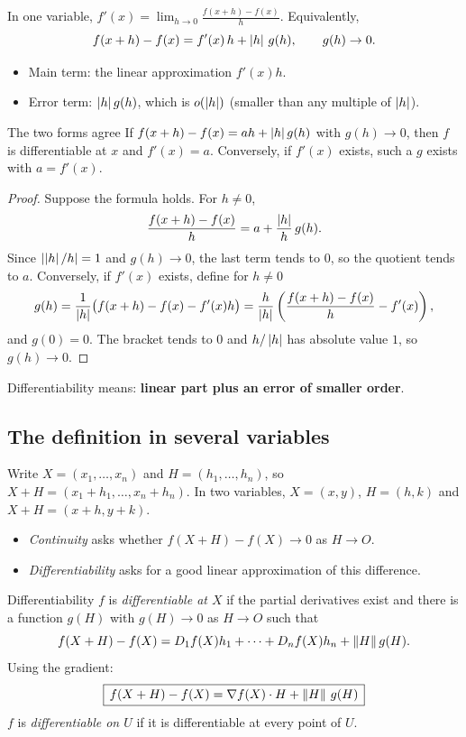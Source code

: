 In one variable, $f'(x)=\lim_{h\to0}\frac{f(x+h)-f(x)}{h}$. Equivalently,
\[
 f(x+h)-f(x)=f'(x)\,h+\left\lvert h\right\rvert\,g(h),\qquad g(h)\to0 .
\]
\begin{itemize}
  \item Main term: the linear approximation $f'(x)h$.
  \item Error term: $\left\lvert h\right\rvert g(h)$, which is $o(\left\lvert h\right\rvert)$ (smaller than any multiple of $\left\lvert h\right\rvert$).
\end{itemize}

\begin{proposition}{The two forms agree}
If $f(x+h)-f(x)=ah+\left\lvert h\right\rvert g(h)$ with $g(h)\to0$, then $f$ is differentiable at $x$ and
$f'(x)=a$. Conversely, if $f'(x)$ exists, such a $g$ exists with $a=f'(x)$.
\end{proposition}

\begin{proof}
Suppose the formula holds. For $h\neq0$,
\[
\frac{f(x+h)-f(x)}{h}=a+\frac{\left\lvert h\right\rvert}{h}\,g(h).
\]
Since $\left\lvert \left\lvert h\right\rvert/h\right\rvert=1$ and $g(h)\to0$, the last term tends to $0$, so the quotient tends
to $a$. Conversely, if $f'(x)$ exists, define for $h\neq0$
\[
g(h)=\frac{1}{\left\lvert h\right\rvert}\big(f(x+h)-f(x)-f'(x)h\big)=\frac{h}{\left\lvert h\right\rvert}\left(\frac{f(x+h)-f(x)}{h}-f'(x)\right),
\]
and $g(0)=0$. The bracket tends to $0$ and $h/\left\lvert h\right\rvert$ has absolute value $1$, so $g(h)\to0$.
\end{proof}

\begin{keyidea}
Differentiability means: \textbf{linear part plus an error of smaller order}.
\end{keyidea}

\subsection{The definition in several variables}

Write $X=(x_1,\dots,x_n)$ and $H=(h_1,\dots,h_n)$, so $X+H=(x_1+h_1,\dots,x_n+h_n)$. In
two variables, $X=(x,y)$, $H=(h,k)$ and $X+H=(x+h,y+k)$.
\begin{itemize}
  \item \emph{Continuity} asks whether $f(X+H)-f(X)\to0$ as $H\to O$.
  \item \emph{Differentiability} asks for a good linear approximation of this difference.
\end{itemize}

\begin{definition}{Differentiability}
$f$ is \emph{differentiable at $X$} if the partial derivatives exist and there is a
function $g(H)$ with $g(H)\to0$ as $H\to O$ such that
\[
 f(X+H)-f(X)=D_1f(X)h_1+\dots+D_nf(X)h_n+\left\lVert H\right\rVert g(H).
\]
Using the gradient:
\[
 \boxed{\,f(X+H)-f(X)=\nabla f(X)\cdot H+\left\lVert H\right\rVert\,g(H)\,}
\]
$f$ is \emph{differentiable on $U$} if it is differentiable at every point of $U$.
\end{definition}

